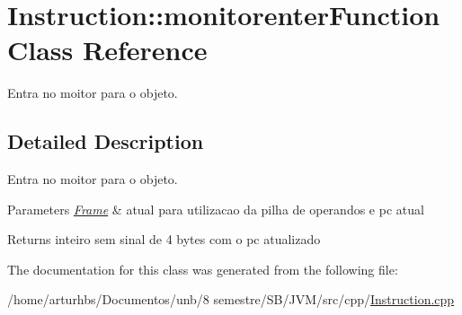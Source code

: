 \hypertarget{classInstruction_1_1monitorenterFunction}{}\section{Instruction\+:\+:monitorenter\+Function Class Reference}
\label{classInstruction_1_1monitorenterFunction}


Entra no moitor para o objeto.  




\subsection{Detailed Description}
Entra no moitor para o objeto. 


\begin{DoxyParams}{Parameters}
{\em \hyperlink{classFrame}{Frame}} & atual para utilizacao da pilha de operandos e pc atual \\
\hline
\end{DoxyParams}
\begin{DoxyReturn}{Returns}
inteiro sem sinal de 4 bytes com o pc atualizado 
\end{DoxyReturn}


The documentation for this class was generated from the following file\+:\begin{DoxyCompactItemize}
\item 
/home/arturhbs/\+Documentos/unb/8 semestre/\+S\+B/\+J\+V\+M/src/cpp/\hyperlink{Instruction_8cpp}{Instruction.\+cpp}\end{DoxyCompactItemize}
